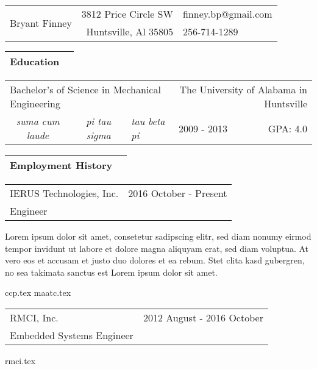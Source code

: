 \documentclass[10pt,a4paper]{article}
\begin{document}
\begin{table}
  \begin{tabularx}{\textwidth}{Xr|l}
    \toprule
    \multirow{2}{*}{\noindent\Huge Bryant Finney} & 3812 Price Circle SW & finney.bp@gmail.com \\
                                                  & Huntsville, Al 35805 & 256-714-1289 \\
    \bottomrule
  \end{tabularx}
\end{table}

\noindent\begin{tabularx}{\textwidth}{Xr}
  \large Education & \\
  \bottomrule
\end{tabularx}
\smallskip

\begin{tabularx}{\textwidth}{ccXlr}
  \multicolumn{3}{l}{Bachelor's of Science in Mechanical Engineering} & \multicolumn{2}{r}{The University of Alabama in Huntsville} \\
  \textit{suma cum laude} & \textit{pi tau sigma} & \textit{tau beta pi} & 2009 - 2013 & GPA: 4.0 \\
\end{tabularx}
\bigskip

\noindent\begin{tabularx}{\textwidth}{Xr}
  \large Employment History & \\
  \bottomrule
\end{tabularx}
\smallskip

\begin{tabularx}{\textwidth}{Xr}
  IERUS Technologies, Inc. & 2016 October - Present \\
  Engineer & \\
\end{tabularx}
\smallskip

Lorem ipsum dolor sit amet, consetetur sadipscing elitr, sed diam nonumy eirmod
tempor invidunt ut labore et dolore magna aliquyam erat, sed diam voluptua. At
vero eos et accusam et justo duo dolores et ea rebum. Stet clita kasd gubergren,
no sea takimata sanctus est Lorem ipsum dolor sit amet.

{ccp.tex}
{maatc.tex}

\begin{tabularx}{\textwidth}{Xr}
  RMCI, Inc. & 2012 August - 2016 October \\
  Embedded Systems Engineer & \\
\end{tabularx}
\smallskip

{rmci.tex}
\end{document}
